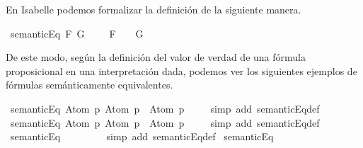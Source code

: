 \begin{isabellebody}
\begin{isamarkuptext}
  En Isabelle podemos formalizar la definición de la siguiente manera.%
\end{isamarkuptext}\isamarkuptrue%
\isamarkupfalse%
\ {\isachardoublequoteopen}semanticEq\ F\ G\ {\isasymequiv}\ {\isasymforall}{\isasymA}{\isachardot}\ {\isacharparenleft}{\isasymA}\ {\isasymTurnstile}\ F{\isacharparenright}\ {\isasymlongleftrightarrow}\ {\isacharparenleft}{\isasymA}\ {\isasymTurnstile}\ G{\isacharparenright}{\isachardoublequoteclose}%
\begin{isamarkuptext}%
De este modo, según la definición del valor de verdad de una fórmula proposicional en una 
  interpretación dada, podemos ver los siguientes ejemplos de fórmulas semánticamente equivalentes.%
\end{isamarkuptext}\isamarkuptrue%
\isamarkupfalse%
\ {\isachardoublequoteopen}semanticEq\ {\isacharparenleft}Atom\ p{\isacharparenright}\ {\isacharparenleft}{\isacharparenleft}Atom\ p{\isacharparenright}\ \isactrlbold {\isasymor}\ {\isacharparenleft}Atom\ p{\isacharparenright}{\isacharparenright}{\isachardoublequoteclose}\ \isanewline
%
\isadelimproof
\ \ %
\endisadelimproof
%
\isatagproof
{}\isamarkupfalse%
\ {\isacharparenleft}simp\ add{\isacharcolon}\ semanticEq{\isacharunderscore}def{\isacharparenright}%
\endisatagproof
{\isafoldproof}%
%
\isadelimproof
\isanewline
%
\endisadelimproof
\isanewline
{}\isamarkupfalse%
\ {\isachardoublequoteopen}semanticEq\ {\isacharparenleft}Atom\ p{\isacharparenright}\ {\isacharparenleft}{\isacharparenleft}Atom\ p{\isacharparenright}\ \isactrlbold {\isasymand}\ {\isacharparenleft}Atom\ p{\isacharparenright}{\isacharparenright}{\isachardoublequoteclose}\ \isanewline
%
\isadelimproof
\ \ %
\endisadelimproof
%
\isatagproof
{}\isamarkupfalse%
\ {\isacharparenleft}simp\ add{\isacharcolon}\ semanticEq{\isacharunderscore}def{\isacharparenright}%
\endisatagproof
{\isafoldproof}%
%
\isadelimproof
\isanewline
%
\endisadelimproof
\isanewline
{}\isamarkupfalse%
\ {\isachardoublequoteopen}semanticEq\ {\isasymbottom}\ {\isacharparenleft}{\isasymbottom}\ \isactrlbold {\isasymand}\ {\isasymbottom}{\isacharparenright}{\isachardoublequoteclose}\ \isanewline
%
\isadelimproof
\ \ %
\endisadelimproof
%
\isatagproof
{}\isamarkupfalse%
\ {\isacharparenleft}simp\ add{\isacharcolon}\ semanticEq{\isacharunderscore}def{\isacharparenright}%
\endisatagproof
{\isafoldproof}%
%
\isadelimproof
\isanewline
%
\endisadelimproof
\isanewline
{}\isamarkupfalse%
\ {\isachardoublequoteopen}semanticEq\ {\isasymbottom}\ {\isacharparenleft}{\isasymbottom}\ \isactrlbold {\isasymor}\ {\isasymbottom}{\isacharparenright}{\isachardoublequoteclose}\ \isanewline

\end{isabellebody}
